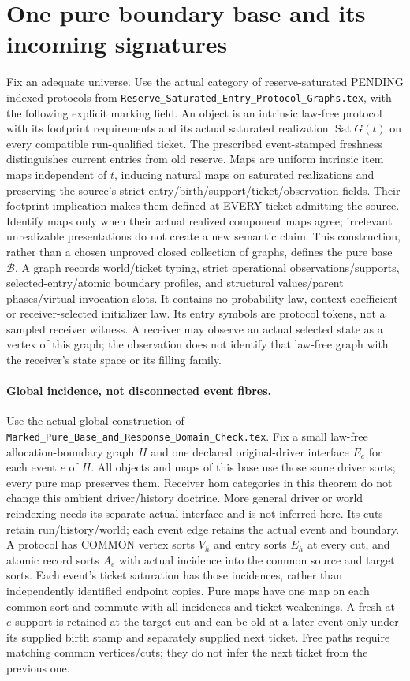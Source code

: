 \documentclass[11pt]{article}
\begin{document}
\section{One pure boundary base and its incoming signatures}
Fix an adequate universe. Use the actual category of reserve-saturated PENDING indexed protocols from \texttt{Reserve\_Saturated\_Entry\_Protocol\_Graphs.tex}, with the following explicit marking field. An object is an intrinsic law-free protocol with its footprint requirements and its actual saturated realization $\operatorname{Sat}G(t)$ on every compatible run-qualified ticket. The prescribed event-stamped freshness distinguishes current entries from old reserve. Maps are uniform intrinsic item maps independent of $t$, inducing natural maps on saturated realizations and preserving the source's strict entry/birth/support/ticket/observation fields. Their footprint implication makes them defined at EVERY ticket admitting the source. Identify maps only when their actual realized component maps agree; irrelevant unrealizable presentations do not create a new semantic claim. This construction, rather than a chosen unproved closed collection of graphs, defines the pure base $\mathcal B$. A graph records world/ticket typing, strict operational observations/supports, selected-entry/atomic boundary profiles, and structural values/parent phases/virtual invocation slots. It contains no probability law, context coefficient or receiver-selected initializer law. Its entry symbols are protocol tokens, not a sampled receiver witness. A receiver may observe an actual selected state as a vertex of this graph; the observation does not identify that law-free graph with the receiver's state space or its filling family.

\paragraph{Global incidence, not disconnected event fibres.}
Use the actual global construction of \texttt{Marked\_Pure\_Base\_and\_Response\_Domain\_Check.tex}. Fix a small law-free allocation-boundary graph $H$ and one declared original-driver interface $E_e$ for each event $e$ of $H$. All objects and maps of this base use those same driver sorts; every pure map preserves them. Receiver hom categories in this theorem do not change this ambient driver/history doctrine. More general driver or world reindexing needs its separate actual interface and is not inferred here. Its cuts retain run/history/world; each event edge retains the actual event and boundary. A protocol has COMMON vertex sorts $V_h$ and entry sorts $E_h$ at every cut, and atomic record sorts $A_e$ with actual incidence into the common source and target sorts. Each event's ticket saturation has those incidences, rather than independently identified endpoint copies. Pure maps have one map on each common sort and commute with all incidences and ticket weakenings. A fresh-at-$e$ support is retained at the target cut and can be old at a later event only under its supplied birth stamp and separately supplied next ticket. Free paths require matching common vertices/cuts; they do not infer the next ticket from the previous one.
\end{document}
